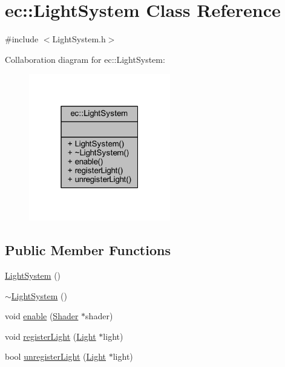 \hypertarget{classec_1_1_light_system}{}\section{ec\+:\+:Light\+System Class Reference}
\label{classec_1_1_light_system}


{\ttfamily \#include $<$Light\+System.\+h$>$}



Collaboration diagram for ec\+:\+:Light\+System\+:\nopagebreak
\begin{figure}[H]
\begin{center}
\leavevmode
\includegraphics[width=175pt]{classec_1_1_light_system__coll__graph}
\end{center}
\end{figure}
\subsection*{Public Member Functions}
\begin{DoxyCompactItemize}
\item 
\mbox{\hyperlink{classec_1_1_light_system_ac4139d25af9956b05e4d74db83f10ede}{Light\+System}} ()
\item 
\mbox{\hyperlink{classec_1_1_light_system_a945503a2b607e87f13f87e5f95d157ef}{$\sim$\+Light\+System}} ()
\item 
void \mbox{\hyperlink{classec_1_1_light_system_a6569ed0dd8a15a461358add2ee514f92}{enable}} (\mbox{\hyperlink{classec_1_1_shader}{Shader}} $\ast$shader)
\item 
void \mbox{\hyperlink{classec_1_1_light_system_aedb1b50a5920e42732e53f8eb8a5410d}{register\+Light}} (\mbox{\hyperlink{classec_1_1_light}{Light}} $\ast$light)
\item 
bool \mbox{\hyperlink{classec_1_1_light_system_ab1bd930134d6305a5666a165fc41d0f5}{unregister\+Light}} (\mbox{\hyperlink{classec_1_1_light}{Light}} $\ast$light)
\end{DoxyCompactItemize}



